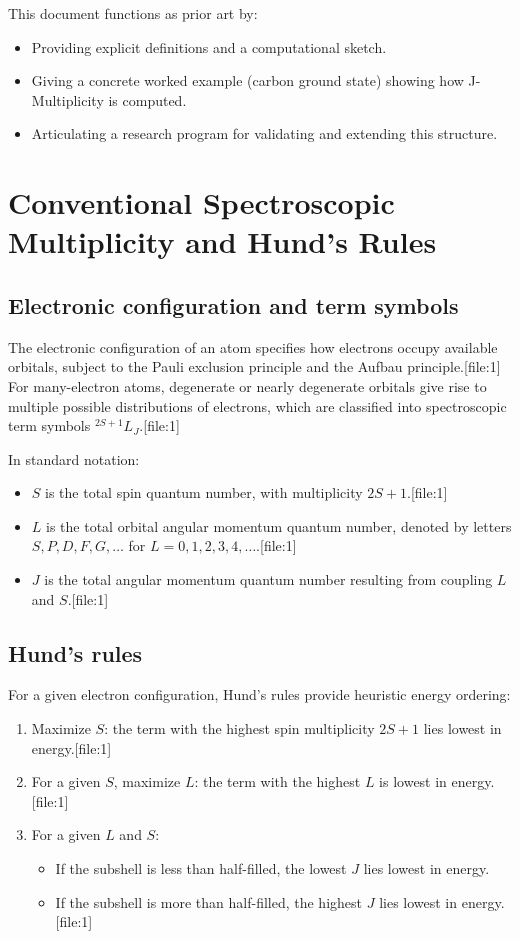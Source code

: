 \documentclass[11pt]{article}
\begin{document}
This document functions as prior art by:
\begin{itemize}
  \item Providing explicit definitions and a computational sketch.
  \item Giving a concrete worked example (carbon ground state) showing how J-Multiplicity is computed.
  \item Articulating a research program for validating and extending this structure.
\end{itemize}

\section{Conventional Spectroscopic Multiplicity and Hund's Rules}

\subsection{Electronic configuration and term symbols}

The electronic configuration of an atom specifies how electrons occupy available orbitals, subject to the Pauli exclusion principle and the Aufbau principle.[file:1] For many-electron atoms, degenerate or nearly degenerate orbitals give rise to multiple possible distributions of electrons, which are classified into spectroscopic term symbols \(^{2S+1}L_J\).[file:1]

In standard notation:
\begin{itemize}
  \item \(S\) is the total spin quantum number, with multiplicity \(2S+1\).[file:1]
  \item \(L\) is the total orbital angular momentum quantum number, denoted by letters \(S,P,D,F,G,\dots\) for \(L=0,1,2,3,4,\dots\).[file:1]
  \item \(J\) is the total angular momentum quantum number resulting from coupling \(L\) and \(S\).[file:1]
\end{itemize}

\subsection{Hund's rules}

For a given electron configuration, Hund's rules provide heuristic energy ordering:
\begin{enumerate}
  \item Maximize \(S\): the term with the highest spin multiplicity \(2S+1\) lies lowest in energy.[file:1]
  \item For a given \(S\), maximize \(L\): the term with the highest \(L\) is lowest in energy.[file:1]
  \item For a given \(L\) and \(S\):
    \begin{itemize}
      \item If the subshell is less than half-filled, the lowest \(J\) lies lowest in energy.
      \item If the subshell is more than half-filled, the highest \(J\) lies lowest in energy.[file:1]
    \end{itemize}
\end{enumerate}
\end{document}

